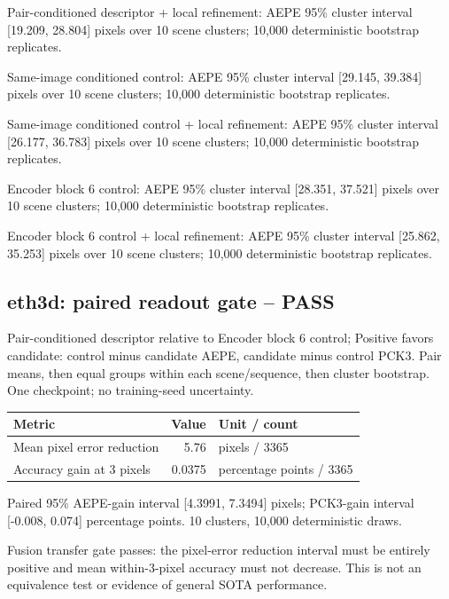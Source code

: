 \documentclass[10pt]{article}
\begin{document}
Pair-conditioned descriptor + local refinement: AEPE 95\% cluster interval [19.209, 28.804] pixels over 10 scene clusters; 10,000 deterministic bootstrap replicates.

Same-image conditioned control: AEPE 95\% cluster interval [29.145, 39.384] pixels over 10 scene clusters; 10,000 deterministic bootstrap replicates.

Same-image conditioned control + local refinement: AEPE 95\% cluster interval [26.177, 36.783] pixels over 10 scene clusters; 10,000 deterministic bootstrap replicates.

Encoder block 6 control: AEPE 95\% cluster interval [28.351, 37.521] pixels over 10 scene clusters; 10,000 deterministic bootstrap replicates.

Encoder block 6 control + local refinement: AEPE 95\% cluster interval [25.862, 35.253] pixels over 10 scene clusters; 10,000 deterministic bootstrap replicates.

\subsection{eth3d: paired readout gate -- PASS}
Pair-conditioned descriptor relative to Encoder block 6 control; Positive favors candidate: control minus candidate AEPE, candidate minus control PCK3. Pair means, then equal groups within each scene/sequence, then cluster bootstrap. One checkpoint; no training-seed uncertainty.
\begin{center}\begin{tabular}{p{.57\linewidth}rp{.23\linewidth}}\toprule Metric & Value & Unit / count \\ \midrule
Mean pixel error reduction & 5.76 & pixels / 3365 \\
Accuracy gain at 3 pixels & 0.0375 & percentage points / 3365 \\
\bottomrule\end{tabular}\end{center}
Paired 95\% AEPE-gain interval [4.3991, 7.3494] pixels; PCK3-gain interval [-0.008, 0.074] percentage points. 10 clusters, 10,000 deterministic draws.

Fusion transfer gate passes: the pixel-error reduction interval must be entirely positive and mean within-3-pixel accuracy must not decrease. This is not an equivalence test or evidence of general SOTA performance.
\end{document}
